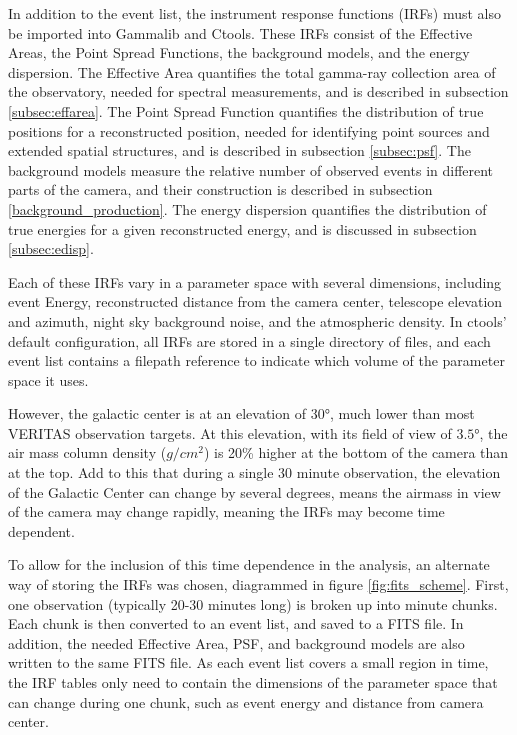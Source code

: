 In addition to the event list, the instrument response functions (IRFs) must also be imported into Gammalib and Ctools.
These IRFs consist of the Effective Areas, the Point Spread Functions, the background models, and the energy dispersion.
The Effective Area quantifies the total gamma-ray collection area of the observatory, needed for spectral measurements, and is described in subsection \ref{subsec:effarea}.
The Point Spread Function quantifies the distribution of true positions for a reconstructed position, needed for identifying point sources and extended spatial structures, and is described in subsection \ref{subsec:psf}.
The background models measure the relative number of observed events in different parts of the camera, and their construction is described in subsection \ref{background_production}.
The energy dispersion quantifies the distribution of true energies for a given reconstructed energy, and is discussed in subsection \ref{subsec:edisp}.

Each of these IRFs vary in a parameter space with several dimensions, including event Energy, reconstructed distance from the camera center, telescope elevation and azimuth, night sky background noise, and the atmospheric density.
In ctools' default configuration, all IRFs are stored in a single directory of files, and each event list contains a filepath reference to indicate which volume of the parameter space it uses.

However, the galactic center is at an elevation of $\ang{30}$, much lower than most VERITAS observation targets.
At this elevation, with its field of view of $\ang{3.5}$, the air mass column density ($g/cm^{2}$) is 20\% higher at the bottom of the camera than at the top.
Add to this that during a single 30 minute observation, the elevation of the Galactic Center can change by several degrees, means the airmass in view of the camera may change rapidly, meaning the IRFs may become time dependent.

To allow for the inclusion of this time dependence in the analysis, an alternate way of storing the IRFs was chosen, diagrammed in figure \ref{fig:fits_scheme}.
First, one observation (typically 20-30 minutes long) is broken up into  minute chunks.
Each chunk is then converted to an event list, and saved to a FITS file.
In addition, the needed Effective Area, PSF, and background models are also written to the same FITS file.
As each event list covers a small region in time, the IRF tables only need to contain the dimensions of the parameter space that can change during one chunk, such as event energy and distance from camera center.

